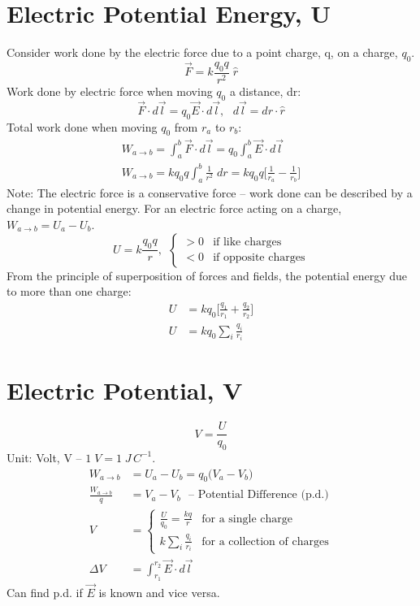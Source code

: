 \documentclass[a4paper, 11pt, normalem]{report}
\begin{document}
\section{Electric Potential Energy, U}
Consider work done by the electric force due to a point charge, q, on a charge, $q_{0}$.
\begin{equation}
    \vec{F} = k \frac{q_{0} q}{r^{2}} \; \hat{r}
\end{equation}
Work done by electric force when moving $q_{0}$ a distance, dr:
\begin{equation}
    \vec{F} \cdot d\vec{l} = q_{0}\vec{E} \cdot d\vec{l}, ~~~ d\vec{l} = dr \cdot \hat{r}
\end{equation}
Total work done when moving $q_{0}$ from $r_{a}$ to $r_{b}$:
\begin{gather}
    W_{a \to b} = \int_{a}^{b} \vec{F} \cdot d\vec{l} = q_{0} \int_{a}^{b} \vec{E} \cdot d\vec{l} \\
    W_{a \to b} = k q_{0} q \int_{a}^{b} \frac{1}{r^{2}} \; dr = k q_{0} q \Big[\frac{1}{r_{a}} - \frac{1}{r_{b}} \Big]
\end{gather}
Note: The electric force is a conservative force -- work done can be described by a change in potential energy. 
For an electric force acting on a charge, $W_{a \to b} = U_{a} - U_{b}$.
\begin{equation}
    U = k \frac{q_{0} q}{r}, ~~
    \begin{cases}
        > 0 & \text{if like charges} \\
        < 0 & \text{if opposite charges}
    \end{cases}
\end{equation}
From the principle of superposition of forces and fields, the potential energy due to more than one charge:
\begin{align}
    U &= kq_{0}\Big[\frac{q_{1}}{r_{1}} + \frac{q_{2}}{r_{2}} \Big]\\
    U &= kq_{0} \sum_{i} \frac{q_{i}}{r_{i}}
\end{align}

\section{Electric Potential, V}
\begin{equation}
    V = \frac{U}{q_{0}}
\end{equation}
Unit: Volt, V -- $1\;V = 1\;J\,C^{-1}$.
\begin{align}
    W_{a \to b} &= U_{a} - U_{b} = q_{0} \big(V_{a} - V_{b}\big) \\
    \frac{W_{a \to b}}{q} &= V_{a} - V_{b} ~~~ \text{-- Potential Difference (p.d.)} \\
    V &=
    \begin{cases}
        \frac{U}{q_{0}} = \frac{kq}{r} & \text{for a single charge} \\
        k \sum_{i} \frac{q_{i}}{r_{i}} & \text{for a collection of charges}
    \end{cases} \\
    \Delta V &= \int_{r_{1}}^{r_{2}} \vec{E} \cdot d\vec{l}
\end{align}
Can find p.d. if $\vec{E}$ is known and vice versa.
\end{document}
